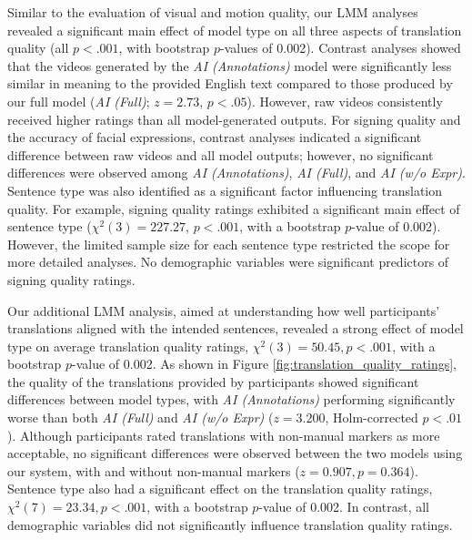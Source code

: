 
Similar to the evaluation of visual and motion quality, our LMM analyses revealed a significant main effect of model type on all three aspects of translation quality (all $p < .001$, with bootstrap $p$-values of 0.002). Contrast analyses showed that the videos generated by the \textit{AI (Annotations)} model were significantly less similar in meaning to the provided English text compared to those produced by our full model (\textit{AI (Full)}; $z = 2.73$, $p < .05$). However, raw videos consistently received higher ratings than all model-generated outputs. For signing quality and the accuracy of facial expressions, contrast analyses indicated a significant difference between raw videos and all model outputs; however, no significant differences were observed among \textit{AI (Annotations)}, \textit{AI (Full)}, and \textit{AI (w/o Expr)}. Sentence type was also identified as a significant factor influencing translation quality. For example, signing quality ratings exhibited a significant main effect of sentence type ($\chi^2(3) = 227.27$, $p < .001$, with a bootstrap $p$-value of 0.002). However, the limited sample size for each sentence type restricted the scope for more detailed analyses. No demographic variables were  significant predictors of signing quality ratings.


Our additional LMM analysis, aimed at understanding how well participants' translations aligned with the intended sentences, revealed a strong effect of model type on average translation quality ratings, $\chi^2(3) = 50.45, p < .001$, with a bootstrap $p$-value of 0.002. As shown in Figure \ref{fig:translation_quality_ratings}, the quality of the translations provided by participants showed significant differences between model types, with \textit{AI (Annotations)} performing significantly worse than both \textit{AI (Full)} and \textit{AI (w/o Expr)} ($z = 3.200$, Holm-corrected $p < .01$). Although participants rated translations with non-manual markers as more acceptable, no significant differences were observed between the two models using our system, with and without non-manual markers ($z = 0.907, p = 0.364$). Sentence type also had a significant effect on the translation quality ratings, $\chi^2(7) = 23.34, p < .001$, with a bootstrap $p$-value of 0.002. In contrast, all demographic variables did not significantly influence translation quality ratings. 


